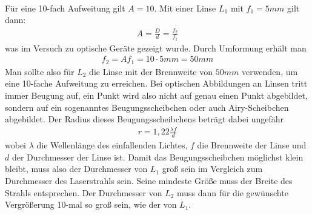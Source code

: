 \documentclass[a4paper,10pt]{scrartcl}
\begin{document}
\FloatBarrier
			\\
			Für eine 10-fach Aufweitung gilt \(A=10\). Mit einer Linse \(L_{1}\) mit \(f_{1}=5mm\) gilt dann:
			\begin{align*}
			A=\frac{D}{d}=\frac{f_{2}}{f_{1}}
			\end{align*}
			was im Versuch zu optische Geräte gezeigt wurde. Durch Umformung erhält man
			\begin{align*}
			f_{2}=Af_{1}=10 \cdot 5mm=50mm
			\end{align*}
			Man sollte also für \(L_{2}\) die Linse mit der Brennweite von \(50mm\) verwenden, um eine 10-fache Aufweitung zu erreichen. Bei optischen Abbildungen an Linsen tritt immer Beugung auf, ein Punkt wird also nicht auf genau einen Punkt abgebildet, sondern auf ein sogenanntes Beugungsscheibchen oder auch Airy-Scheibchen abgebildet. Der Radius dieses Beugungsscheibchens beträgt dabei ungefähr
			\begin{align*}
			r=1,22\frac{\lambda f}{d}
			\end{align*}
			wobei \(\lambda\) die Wellenlänge des einfallenden Lichtes, \(f\) die Brennweite der Linse und \(d\) der Durchmesser der Linse ist. Damit das Beugungsscheibchen möglichst klein bleibt, muss also der Durchmesser von \(L_{1}\) groß sein im Vergleich zum Durchmesser des Laserstrahls sein. Seine mindeste Größe muss der Breite des Strahls entsprechen. Der Durchmesser von \(L_{2}\) muss dann für die gewünschte Vergrößerung 10-mal so groß sein, wie der von \(L_{1}\).
			
\end{document}
